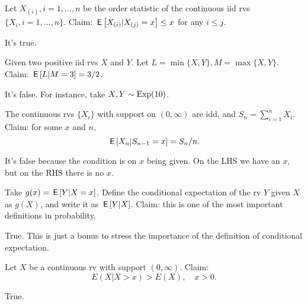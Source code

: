 \documentclass[tf-tutorial-all.tex]{subfiles}
\begin{document}



\begin{truefalse}
Let $X_{(i)}, i = 1, \ldots, n$ be the order statistic of the continuous iid rvs $\{X_{i}, i=1, \ldots, n\}$.
Claim: $\,\mathsf{E}\left[X_{(i)} | X_{(j)}=x\right] \leq x$ for any $i\leq j$.
\begin{solution}
It's true.
\end{solution}
\end{truefalse}

\begin{truefalse}
Given two positive iid rvs $X$ and $Y$. Let $L=\min\{X,  Y\}, M = \max\{X, Y\}$. Claim: $\,\mathsf{E}\left[L|M=3\right]=3/2$.

\begin{solution}
It's false. For instance, take $X, Y \sim \mathrm{Exp}(10)$.
\end{solution}
\end{truefalse}

\begin{truefalse}
The continuous rvs $\{X_{i}\}$ with support on $(0, \infty)$ are idd, and $S_n=\sum_{i=1}^n X_{i}$.
Claim: for some $x$ and $n$,
\begin{equation}
\label{eq:6}
\,\mathsf{E}\left[X_{n}| S_{n-1} = x\right] = S_n/n.
\end{equation}
\begin{solution}
It's false because the condition is on $x$ being given. On the LHS we have an $x$, but on the RHS there is no $x$.
\end{solution}
\end{truefalse}

\begin{truefalse}
Take $g(x) = \,\mathsf{E}\left[Y|X=x\right]$.
Define the conditional expectation of the rv $Y$ given $X$ as $g(X)$, and write it as $\,\mathsf{E}\left[Y|X\right]$.
Claim: this is one of the most important definitions in probability.

\begin{solution}
True. This is just a bonus to stress the importance of the definition of conditional expectation.
\end{solution}
\end{truefalse}


\begin{truefalse}
Let $X$ be a continuous rv with support $(0, \infty)$. Claim:
\begin{equation}
\label{eq:6}
E(X|X>x)>E(X), \quad x>0.
\end{equation}
\begin{solution}
True.
\end{solution}
\end{truefalse}
\end{document}
